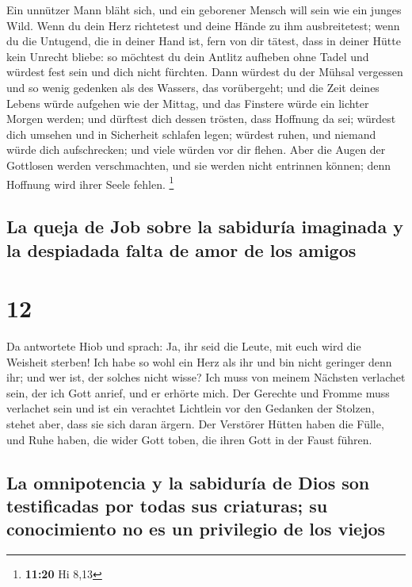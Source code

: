  Ein unnützer Mann bläht sich, und ein geborener Mensch
will sein wie ein junges Wild.  Wenn du dein Herz
richtetest und deine Hände zu ihm ausbreitetest;  wenn du
die Untugend, die in deiner Hand ist, fern von dir tätest, dass in
deiner Hütte kein Unrecht bliebe:  so möchtest du dein
Antlitz aufheben ohne Tadel und würdest fest sein und dich nicht
fürchten.  Dann würdest du der Mühsal vergessen und so
wenig gedenken als des Wassers, das vorübergeht;  und die
Zeit deines Lebens würde aufgehen wie der Mittag, und das Finstere würde
ein lichter Morgen werden;  und dürftest dich dessen
trösten, dass Hoffnung da sei; würdest dich umsehen und in Sicherheit
schlafen legen;  würdest ruhen, und niemand würde dich
aufschrecken; und viele würden vor dir flehen.  Aber die
Augen der Gottlosen werden verschmachten, und sie werden nicht entrinnen
können; denn Hoffnung wird ihrer Seele fehlen. \footnote{\textbf{11:20}
  Hi 8,13}

\hypertarget{la-queja-de-job-sobre-la-sabiduruxeda-imaginada-y-la-despiadada-falta-de-amor-de-los-amigos}{%
\subsection{La queja de Job sobre la sabiduría imaginada y la despiadada
falta de amor de los
amigos}\label{la-queja-de-job-sobre-la-sabiduruxeda-imaginada-y-la-despiadada-falta-de-amor-de-los-amigos}}

\hypertarget{section-11}{%
\section{12}\label{section-11}}

 Da antwortete Hiob und sprach:  Ja, ihr
seid die Leute, mit euch wird die Weisheit sterben!  Ich
habe so wohl ein Herz als ihr und bin nicht geringer denn ihr; und wer
ist, der solches nicht wisse?  Ich muss von meinem
Nächsten verlachet sein, der ich Gott anrief, und er erhörte mich. Der
Gerechte und Fromme muss verlachet sein  und ist ein
verachtet Lichtlein vor den Gedanken der Stolzen, stehet aber, dass sie
sich daran ärgern.  Der Verstörer Hütten haben die Fülle,
und Ruhe haben, die wider Gott toben, die ihren Gott in der Faust
führen.

\hypertarget{la-omnipotencia-y-la-sabiduruxeda-de-dios-son-testificadas-por-todas-sus-criaturas-su-conocimiento-no-es-un-privilegio-de-los-viejos}{%
\subsection{La omnipotencia y la sabiduría de Dios son testificadas por
todas sus criaturas; su conocimiento no es un privilegio de los
viejos}\label{la-omnipotencia-y-la-sabiduruxeda-de-dios-son-testificadas-por-todas-sus-criaturas-su-conocimiento-no-es-un-privilegio-de-los-viejos}}


